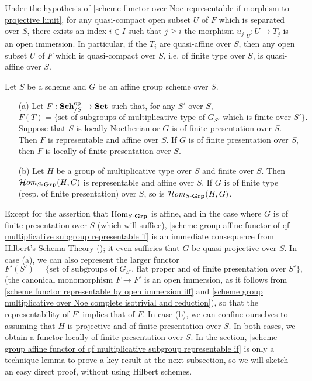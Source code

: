 \begin{corollary}\label{scheme morphism projective limit qc open eventual restrict}
Under the hypothesis of \cref{scheme functor over Noe representable if morphism to projective limit}, for any quasi-compact open subset $U$ of $F$ which is separated over $S$, there exists an index $i\in I$ such that $j\geq i$ the morphism $u_j|_U:U\to T_j$ is an open immersion. In particular, if the $T_i$ are quasi-affine over $S$, then any open subset $U$ of $F$ which is quasi-compact over $S$, i.e. of finite type over $S$, is quasi-affine over $S$.
\end{corollary}

\begin{proposition}\label{scheme group affine functor of qf multiplicative subgroup representable if}
Let $S$ be a scheme and $G$ be an affine group scheme over $S$.
\begin{enumerate}
    \item[(a)] Let $F:\mathbf{Sch}_{/S}^{\mathrm{op}}\to\mathbf{Set}$ such that, for any $S'$ over $S$,
    \[F(T)=\{\text{set of subgroups of multiplicative type of $G_{S'}$ which is finite over $S'$}\}.\]
    Suppose that $S$ is locally Noetherian or $G$ is of finite presentation over $S$. Then $F$ is representable and affine over $S$. If $G$ is of finite presentation over $S$, then $F$ is locally of finite presentation over $S$.
    \item[(b)] Let $H$ be a group of multiplicative type over $S$ and finite over $S$. Then $\operatorname{\mathcal{H}\hspace*{-0.4pt}\textit{om}\hspace{0.5pt}}_{S\textup{-}\mathbf{Grp}}(H,G)$ is representable and affine over $S$. If $G$ is of finite type (resp. of finite presentation) over $S$, so is $\operatorname{\mathcal{H}\hspace*{-0.4pt}\textit{om}\hspace{0.5pt}}_{S\textup{-}\mathbf{Grp}}(H,G)$.
\end{enumerate}
\end{proposition}

\begin{remark}
Except for the assertion that $\mathrm{Hom}_{S\textup{-}\mathbf{Grp}}$ is affine, and in the case where $G$ is of finite presentation over $S$ (which will suffice), \cref{scheme group affine functor of qf multiplicative subgroup representable if} is an immediate consequence from Hilbert's Schema Theory (\cite{TGA4}); it even sufficies that $G$ be quasi-projective over $S$. In case (a), we can also represent the larger functor
\[F'(S')=\{\text{set of subgroups of $G_{S'}$, flat proper and of finite presentation over $S'$}\},\]
(the canonical monomorphism $F\to F'$ is an open immersion, as it follows from \cref{scheme functor representable by open immersion iff} and \cref{scheme group multiplicative over Noe complete isotrivial and reduction}), so that the representability of $F'$ implies that of $F$. In case (b), we can confine ourselves to assuming that $H$ is projective and of finite presentation over $S$. In both cases, we obtain a functor locally of finite presentation over $S$. In the section, \cref{scheme group affine functor of qf multiplicative subgroup representable if} is only a technique lemma to prove a key result at the next subsection, so we will sketch an easy direct proof, without using Hilbert schemes.
\end{remark}

